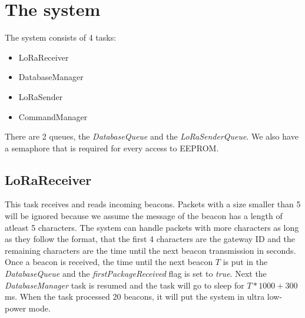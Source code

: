 \documentclass{scrartcl}
\begin{document}


\pagestyle{scrheadings}
\clearscrheadfoot

\cfoot{\pagemark}

\newpage

\section{The system}
The system consists of 4 tasks:
\begin{itemize}
    \item LoRaReceiver
    \item DatabaseManager
    \item LoRaSender
    \item CommandManager
\end{itemize}

There are 2 queues, the \textit{DatabaseQueue} and the \textit{LoRaSenderQueue}.
We also have a semaphore that is required for every access to EEPROM.

\subsection{LoRaReceiver}
This task receives and reads incoming beacons. Packets with a size smaller than 5 will be ignored because
we assume the message of the beacon has a length of atleast 5 characters. The system can handle packets with more characters
as long as they follow the format, that the first 4 characters are the gateway ID and the remaining characters are the time until the
next beacon transmission in seconds. Once a beacon is received, the time until the next beacon $T$ is put in the \textit{DatabaseQueue} and
the \textit{firstPackageReceived} flag is set to \textit{true}.
Next the \textit{DatabaseManager} task is resumed and the task will go to sleep for $T*1000 + 300$ \si{\milli\second}.
When the task processed 20 beacons, it will put the system in ultra low-power mode.
\end{document}
